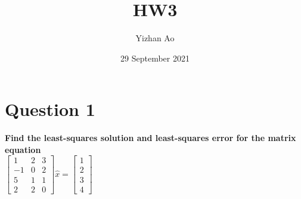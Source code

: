 \documentclass{article}
\title{HW3}
\author{Yizhan Ao}
\date{29 September 2021}
\begin{document}
\maketitle 

\section{Question 1}
\textbf{Find the least-squares solution and least-squares error for the matrix equation \\$ \left[\begin{array}{rrr}
1 & 2 & 3 \\
-1 & 0 & 2 \\
5 & 1 & 1 \\
2 & 2 & 0
\end{array}\right] \hat{x}=\left[\begin{array}{l}
1 \\ 2 \\ 3 \\ 4 \end{array}\right]$}
\end{document}
